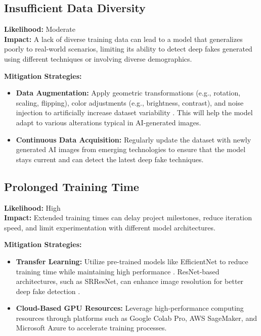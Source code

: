 \documentclass{article} %
\begin{document}
\subsection{Insufficient Data Diversity}
\textbf{Likelihood:} Moderate \\
\textbf{Impact:} A lack of diverse training data can lead to a model that generalizes poorly to real-world scenarios, limiting its ability to detect deep fakes generated using different techniques or involving diverse demographics.

\textbf{Mitigation Strategies:}
\begin{itemize}
    \item \textbf{Data Augmentation:} Apply geometric transformations (e.g., rotation, scaling, flipping), color adjustments (e.g., brightness, contrast), and noise injection to artificially increase dataset variability \citep{shorten2019}. This will help the model adapt to various alterations typical in AI-generated images.
    \item \textbf{Continuous Data Acquisition:} Regularly update the dataset with newly generated AI images from emerging technologies to ensure that the model stays current and can detect the latest deep fake techniques.
\end{itemize}

\subsection{Prolonged Training Time}
\textbf{Likelihood:} High \\
\textbf{Impact:} Extended training times can delay project milestones, reduce iteration speed, and limit experimentation with different model architectures.

\textbf{Mitigation Strategies:}
\begin{itemize}
    \item \textbf{Transfer Learning:} Utilize pre-trained models like EfficientNet to reduce training time while maintaining high performance \citep{tan2019}. ResNet-based architectures, such as SRResNet, can enhance image resolution for better deep fake detection \citep{ledig2017}.
    \item \textbf{Cloud-Based GPU Resources:} Leverage high-performance computing resources through platforms such as Google Colab Pro, AWS SageMaker, and Microsoft Azure to accelerate training processes.
\end{itemize}
\end{document}
